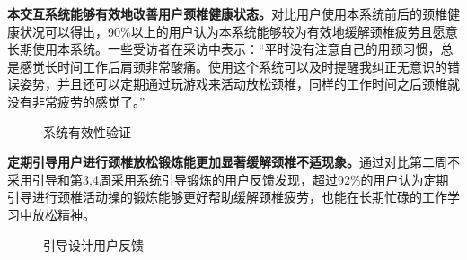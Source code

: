 \documentclass[12pt,a4paper]{article}%
\begin{document}
\textbf{本交互系统能够有效地改善用户颈椎健康状态。}对比用户使用本系统前后的颈椎健康状况可以得出，90\%以上的用户认为本系统能够较为有效地缓解颈椎疲劳且愿意长期使用本系统。一些受访者在采访中表示：“平时没有注意自己的用颈习惯，总是感觉长时间工作后肩颈非常酸痛。使用这个系统可以及时提醒我纠正无意识的错误姿势，并且还可以定期通过玩游戏来活动放松颈椎，同样的工作时间之后颈椎就没有非常疲劳的感觉了。”

\begin{figure}[H]
	\centering  %
	\subfigcapskip=-5pt %
	\caption{系统有效性验证}
\end{figure}

\textbf{定期引导用户进行颈椎放松锻炼能更加显著缓解颈椎不适现象。}通过对比第二周不采用引导和第3,4周采用系统引导锻炼的用户反馈发现，超过92\%的用户认为定期引导进行颈椎活动操的锻炼能够更好帮助缓解颈椎疲劳，也能在长期忙碌的工作学习中放松精神。

\begin{figure}[H]
	\centering  %
	\subfigcapskip=-5pt %
	\caption{引导设计用户反馈}
\end{figure}
\end{document}
